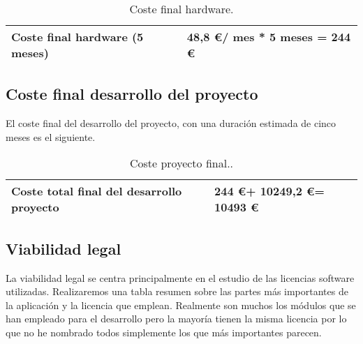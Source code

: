 \begin{description}
\begin{table}[htbp]
\begin{center}
\begin{tabular}{|l|l|}
\hline
\textbf{Coste final hardware} (5 meses)  &  48,8 \euro / mes  *  5 meses = 244 \euro   \\ \hline
\end{tabular}
\caption{Coste final hardware.}
\label{tabla:costefinalhardware}
\end{center}
\end{table}


\subsection{Coste final desarrollo del proyecto}\label{coste-final}

El coste final del desarrollo del proyecto, con una duración estimada de cinco meses es el siguiente.  

\begin{table}[htb]
\begin{center}
\begin{tabular}{|l|l|}
\hline
\textbf{Coste total final del desarrollo proyecto}  &  244 \euro +  10249,2 \euro = 10493 \euro   \\ \hline
\end{tabular}
\caption{Coste proyecto final..}
\label{tabla:costefinal}
\end{center}
\end{table}

\end{description}

\subsection{Viabilidad legal}\label{viabilidad-legal}
La viabilidad legal se centra principalmente en el estudio de las licencias software utilizadas. Realizaremos una tabla resumen sobre las partes más importantes de la aplicación y la licencia que emplean. Realmente son muchos los módulos que se han empleado para el desarrollo pero la mayoría tienen la misma licencia por lo que no he nombrado todos simplemente los que más importantes parecen. 

